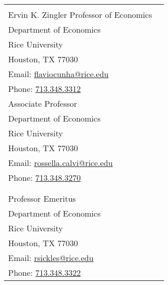 \documentclass[11pt,english]{article}
\begin{document}
\begin{center}
\begin{tabular}{lr}

	\begin{minipage}[t]{0.45\textwidth}
		{\bf Flavio Cunha} (chair) \\
		Ervin K. Zingler Professor of Economics \\
		Department of Economics \\
		Rice University\\
		Houston, TX 77030\\
		Email: \href{mailto:flaviocunha@rice.edu}{flaviocunha@rice.edu}\\
		Phone:  \href{tel:713.348.3312}{713.348.3312}
	\end{minipage}
	&
	\begin{minipage}[t]{0.45\textwidth}
	{\bf Rossella Calvi}\\
	Associate Professor\\
	Department of Economics \\
	Rice University\\
	Houston, TX 77030\\
		Email: \href{mailto:rossella.calvi@rice.edu}{rossella.calvi@rice.edu} \\
		Phone:  \href{tel: 713.348.3270}{713.348.3270}
	\end{minipage}
	\\ \\
\begin{minipage}[t]{0.45\textwidth}
		{\bf Robin Sickles}\\
		Professor Emeritus\\
		Department of Economics \\
		Rice University\\
		Houston, TX 77030\\
		Email: \href{mailto:rsickles@rice.edu}{rsickles@rice.edu}\\
		Phone:  \href{tel: 713.348.3322}{ 713.348.3322}
	\end{minipage}
\end{tabular}
\end{center}
\end{document}
